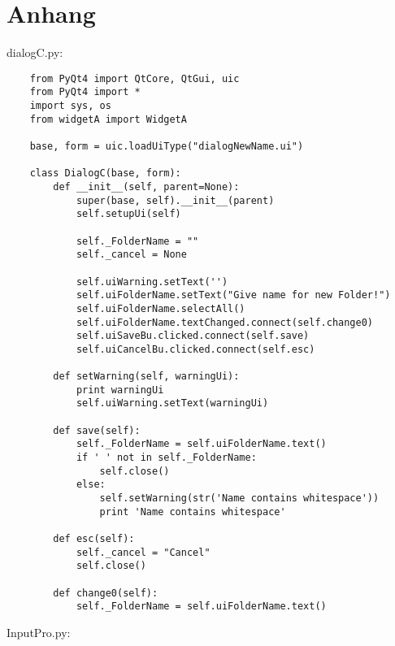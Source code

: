 \chapter{Anhang}

dialogC.py:
\begin{verbatim}
    from PyQt4 import QtCore, QtGui, uic
    from PyQt4 import *
    import sys, os
    from widgetA import WidgetA
    
    base, form = uic.loadUiType("dialogNewName.ui")
    
    class DialogC(base, form):
        def __init__(self, parent=None):
            super(base, self).__init__(parent)
            self.setupUi(self)
    
            self._FolderName = ""
            self._cancel = None
    
            self.uiWarning.setText('')
            self.uiFolderName.setText("Give name for new Folder!")
            self.uiFolderName.selectAll()
            self.uiFolderName.textChanged.connect(self.change0)
            self.uiSaveBu.clicked.connect(self.save)
            self.uiCancelBu.clicked.connect(self.esc)
        
        def setWarning(self, warningUi):
            print warningUi
            self.uiWarning.setText(warningUi)
    
        def save(self):
            self._FolderName = self.uiFolderName.text()
            if ' ' not in self._FolderName:
                self.close()
            else:
                self.setWarning(str('Name contains whitespace'))
                print 'Name contains whitespace'
    
        def esc(self):
            self._cancel = "Cancel"
            self.close()
    
        def change0(self):
            self._FolderName = self.uiFolderName.text()
\end{verbatim}

InputPro.py:


